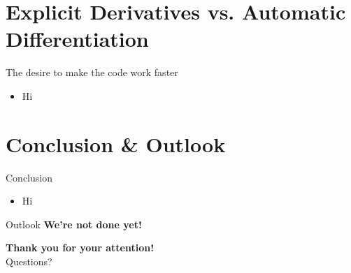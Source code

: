 \documentclass[9pt]{beamer}
\begin{document}
\section{Explicit Derivatives vs. Automatic Differentiation}



\begin{frame}{The desire to make the code work faster}
    \begin{itemize}
        \item Hi
    \end{itemize}
\end{frame}



\section{Conclusion \& Outlook}



\begin{frame}{Conclusion}
    \begin{itemize}
        \item Hi
    \end{itemize}
\end{frame}



\begin{frame}{Outlook}
    \textbf{We're not done yet!}
\end{frame}

\begin{frame}
    \begin{center}
        \textbf{Thank you for your attention!} \\
        Questions?
    \end{center}
\end{frame}
\end{document}

